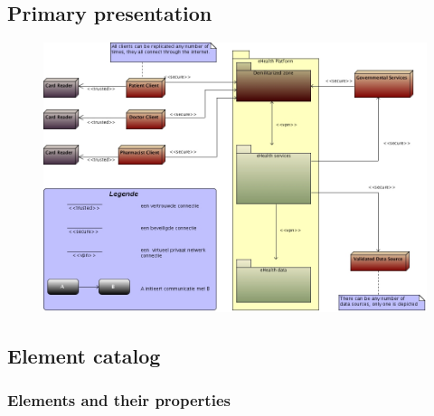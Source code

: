 \documentclass[a4paper,10pt]{paper}
\begin{document}
\subsection{Primary presentation}
\begin{center}
    \begin{figure}
      \includegraphics[width=\textwidth]{../images/deployment_DMZ.jpg}
    \end{figure}
  \end{center}

\subsection{Element catalog}

\subsubsection{Elements and their properties}
\end{document}
